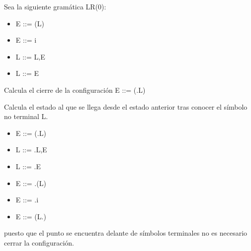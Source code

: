 \documentclass[nochap]{apuntes}
\begin{document}
\begin{problem}
Sea la siguiente gramática LR(0):
\begin{itemize}
\item E ::= (L)
\item E ::= i
\item L ::= L,E
\item L ::= E
\end{itemize}

\ppart Calcula el cierre de la configuración E ::= (.L)

\ppart Calcula el estado al que se llega desde el estado anterior tras conocer el símbolo no terminal L.
\solution
\ppart
\begin{itemize}
\item E ::= (.L)
\item L ::= .L,E
\item L ::= .E
\item E ::= .(L)
\item E ::= .i
\end{itemize}

\ppart
\begin{itemize}
\item E ::= (L.)
\end{itemize}
puesto que el punto se encuentra delante de símbolos terminales no es necesario cerrar la configuración.
\end{problem}
\end{document}
